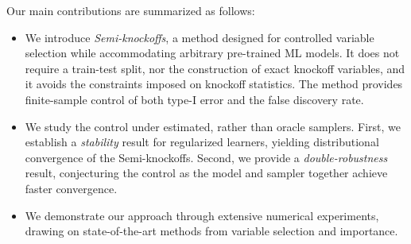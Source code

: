 \documentclass{article}
\theoremstyle{plain}
\theoremstyle{definition}
\theoremstyle{remark}
\begin{document}

Our main contributions are summarized as follows:
\begin{itemize}
    \item We introduce \emph{Semi-knockoffs}, a method designed for controlled variable selection while accommodating arbitrary pre-trained ML models. It does not require a train-test split, nor the construction of exact knockoff variables, and it avoids the constraints imposed on knockoff statistics. The method provides finite-sample control of both type-I error and the false discovery rate.
    \item We study the control under estimated, rather than oracle samplers. First, we establish a \textit{stability} result for regularized learners, yielding distributional convergence of the Semi-knockoffs. Second, we provide a \textit{double-robustness} result, conjecturing the control as the model and sampler together achieve faster convergence.
    \item We demonstrate our approach through extensive numerical experiments, drawing on state-of-the-art methods from variable selection and importance.
\end{itemize}

 
 
 
\end{document}
